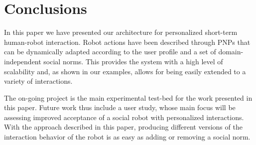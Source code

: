 \vspace{-0.2cm}
\section{Conclusions}
\vspace{-0.1cm}
In this paper we have presented our architecture for personalized
short-term human-robot interaction. Robot actions have been described
through PNPs that can be dynamically adapted according to the user
profile and a set of domain-independent social norms. This provides
the system with a high level of scalability and, as shown in our
examples, allows for being easily extended to a variety of interactions.

The on-going \coaches project is the main experimental test-bed for the work presented in this paper. Future work thus include a user study, whose main focus will be assessing improved acceptance of a social robot with personalized interactions. With the approach described in this paper, producing different versions of the interaction behavior of the robot is as easy as adding or removing a social norm.
